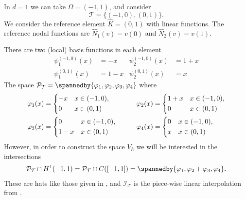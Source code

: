 \begin{example}
    \label{ex:finite-element space d=1}
    In $d=1$ we can take $\Omega = (-1,1)$,
    and consider
    \[
        \mathcal T = \{ (-1,0), (0,1) \}.
    \]
    We consider the reference element $\widehat K = (0,1)$ with linear functions. The reference nodal functions are $\widehat N_1(v) = v(0)$ and $\widehat N_2(v) =v(1)$.

    There are two (local) basis functions in each element
    \begin{align*}
        \psi_1^{(-1,0)}(x) & = -x  & \psi_2^{(-1,0)}(x) & = 1+x
        \\
        \psi_1^{(0,1)}(x)  & = 1-x & \psi_2^{(0,1)}(x)  & = x
    \end{align*}
    The space $\mathcal P_{\mathcal T} = \spannedby\{\varphi_1, \varphi_2, \varphi_3, \varphi_4\}$ where
    \begin{align*}
        \varphi_1(x) & = \begin{dcases}
                             -x & x \in (-1,0), \\
                             0  & x \in (0,1)
                         \end{dcases}
        \qquad       &                            &
        \varphi_2(x) = \begin{dcases}
                           1+x & x \in (-1,0), \\
                           0   & x \in (0,1)
                       \end{dcases}
        \\
        \varphi_3(x) & = \begin{dcases}
                             0   & x \in (-1,0), \\
                             1-x & x \in (0,1)
                         \end{dcases}
        \qquad       &                            & \varphi_4(x) = \begin{dcases}
                                                                       0 & x \in (-1,0), \\
                                                                       x & x \in (0,1)
                                                                   \end{dcases}
    \end{align*}
    However, in order to construct the space $V_h$ we will be interested in the intersections
    \begin{equation*}
        \mathcal P_{\mathcal T} \cap H^1(-1,1) = \mathcal P_{\mathcal T} \cap C([-1,1]) = \spannedby \{ \varphi_1, \varphi_2 + \varphi_3, \varphi_4 \}.
    \end{equation*}
    These are hats like those given in , and $\mathcal I_{\mathcal T}$ is the piece-wise linear interpolation from .


\end{example}
